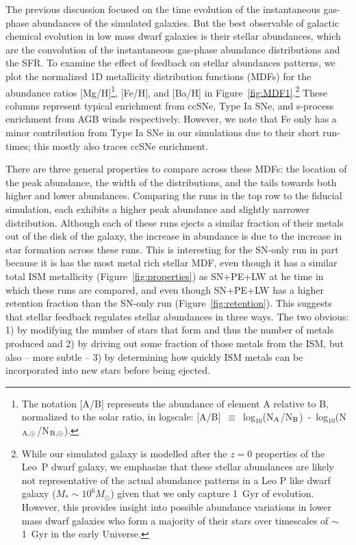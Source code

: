 \documentclass[twocolumn]{aastex62}
\begin{document}
The previous discussion focused on the time evolution of the instantaneous gas-phase abundances of the simulated galaxies. But the best observable of galactic chemical evolution in low mass dwarf galaxies is their stellar abundances, which are the convolution of the instantaneous gas-phase abundance distributions and the SFR. To examine the effect of feedback on stellar abundances patterns, we plot the normalized 1D metallicity distribution functions (MDFs) for the abundance ratios [Mg/H]\footnote{The notation [A/B] represents the abundance of element A relative to B, normalized to the solar ratio, in logscale: [A/B]~$\equiv$~log$_{10}$(N$_{\rm A}$/N$_{\rm B}$)~-~log$_{10}$(N$_{\rm A,\odot}$/N$_{\rm B,\odot}$).}, [Fe/H], and [Ba/H] in Figure~\ref{fig:MDF1}.\footnote{ While our simulated galaxy is modelled after the $z=0$ properties of the Leo~P dwarf galaxy, we emphasize that these stellar abundances are likely not representative of the actual abundance patterns in a Leo P like dwarf galaxy ($M_* \sim 10^6 M_{\odot}$) given that we only capture 1~Gyr of evolution. However, this provides insight into possible abundance variations in lower mass dwarf galaxies who form a majority of their stars over timescales of $\sim$1~Gyr in the early Universe.} These columns represent typical enrichment from ccSNe, Type Ia SNe, and s-process enrichment from AGB winds respectively. However, we note that Fe only has a minor contribution from Type Ia SNe in our simulations due to their short run-times; this mostly also traces ccSNe enrichment. 

There are three general properties to compare across these MDFs: the location of the peak abundance, the width of the distributions, and the tails towards both higher and lower abundances. Comparing the runs in the top row to the fiducial simulation, each exhibits a higher peak abundance and slightly narrower distribution. Although each of these runs ejects a similar fraction of their metals out of the disk of the galaxy, the increase in abundance is due to the increase in star formation across these runs. This is interesting for the SN-only run in part because it is has the most metal rich stellar MDF, even though it has a similar total ISM metallicity (Figure~\ref{fig:properties}) as SN+PE+LW at he time in which these runs are compared, and even though SN+PE+LW has a higher retention fraction than the SN-only run (Figure~\ref{fig:retention}). This suggests that stellar feedback regulates stellar abundances in three ways. The two obvious: 1) by modifying the number of stars that form and thus the number of metals produced and 2) by driving out some fraction of those metals from the ISM, but also  -- more subtle -- 3) by determining how quickly ISM metals can be incorporated into new stars before being ejected. 
\end{document}
